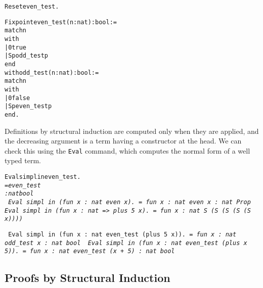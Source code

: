 \documentclass[11pt]{article}
\newtheorem{exercise}{Exercise}[section]
\begin{document}
\begin{alltt}
Reset even_test.



Fixpoint even_test (n:nat) : bool :=
  match n
  with
      | 0 {\funarrow}  true
      | S p {\funarrow} odd_test p
  end
with odd_test (n:nat) : bool :=
  match n
  with
     | 0 {\funarrow} false
     | S p {\funarrow} even_test p
 end.
\end{alltt}


Definitions by structural induction are computed
 only when they are applied, and the decreasing argument
is a term having a constructor at the head. We can check this using
the \texttt{Eval} command, which computes the normal form of a well
typed term.

\begin{alltt}
Eval simpl in even_test.
\it
    = even_test
     : nat {\arrow} bool
\tt
Eval simpl in (fun x : nat {\funarrow} even x).
\it
     = fun x : nat {\funarrow} even x
     : nat {\arrow} Prop
\tt
Eval simpl in (fun x : nat => plus 5 x).
\it
     =  fun x : nat {\funarrow} S (S (S (S (S x))))

\tt
Eval simpl in (fun x : nat {\funarrow} even_test (plus 5 x)).
\it
    = fun x : nat {\funarrow} odd_test x
     : nat {\arrow} bool
\tt
Eval simpl in (fun x : nat {\funarrow} even_test (plus x 5)).
\it
    = fun x : nat {\funarrow} even_test (x + 5)
     : nat {\arrow} bool
\end{alltt}



\subsection{Proofs by Structural Induction}
\end{document}
